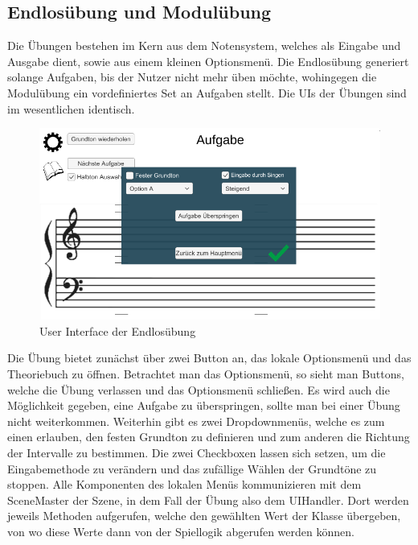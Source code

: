 \subsection*{Endlosübung und Modulübung}
Die Übungen bestehen im Kern aus dem Notensystem, welches als Eingabe und Ausgabe dient, sowie aus einem kleinen Optionsmenü. Die Endlosübung generiert solange Aufgaben, bis der Nutzer nicht mehr üben möchte, wohingegen die Modulübung ein vordefiniertes Set an Aufgaben stellt. Die UIs der Übungen sind im wesentlichen identisch. 
\begin{figure}[H]
    \centering
    \includegraphics[width=1\textwidth]{Bilder/endlosspiel.png}
    \caption{User Interface der Endlosübung}
    \label{sec:hps_algo}
\end{figure}
Die Übung bietet zunächst über zwei Button an, das lokale Optionsmenü und das Theoriebuch zu öffnen. Betrachtet man das Optionsmenü, so sieht man Buttons, welche die Übung verlassen und das Optionsmenü schließen. Es wird auch die Möglichkeit gegeben, eine Aufgabe zu überspringen, sollte man bei einer Übung nicht weiterkommen. Weiterhin gibt es zwei Dropdownmenüs, welche es zum einen erlauben, den festen Grundton zu definieren und zum anderen die Richtung der Intervalle zu bestimmen. Die zwei Checkboxen lassen sich setzen, um die Eingabemethode zu verändern und das zufällige Wählen der Grundtöne zu stoppen. Alle Komponenten des lokalen Menüs kommunizieren mit dem SceneMaster der Szene, in dem Fall der Übung also dem UIHandler. Dort werden jeweils Methoden aufgerufen, welche den gewählten Wert der Klasse übergeben, von wo diese Werte dann von der Spiellogik abgerufen werden können. \\
